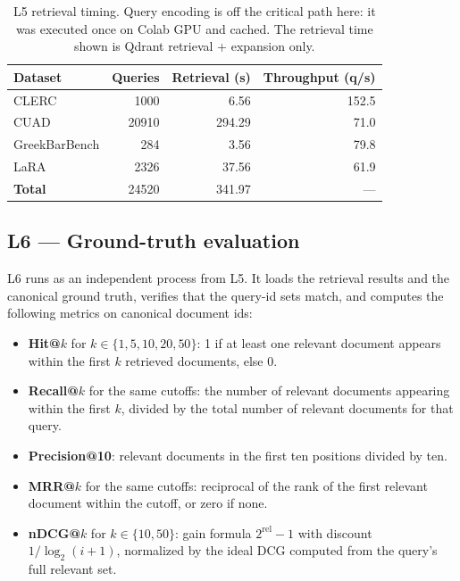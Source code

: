 \documentclass[11pt,a4paper]{article}
\begin{document}
\begin{table}[h]
\centering
\caption{L5 retrieval timing. Query encoding is off the critical
path here: it was executed once on Colab GPU and cached. The
retrieval time shown is Qdrant retrieval + expansion only.}
\label{tab:l5}
\small
\begin{tabular}{l r r r}
\toprule
\textbf{Dataset} & \textbf{Queries} & \textbf{Retrieval (s)}
  & \textbf{Throughput (q/s)} \\
\midrule
CLERC              & \num{1000}  & \num{6.56}   & \num{152.5} \\
CUAD               & \num{20910} & \num{294.29} & \num{71.0} \\
GreekBarBench      & \num{284}   & \num{3.56}   & \num{79.8} \\
LaRA               & \num{2326}  & \num{37.56}  & \num{61.9} \\
\midrule
\textbf{Total}     & \num{24520} & \num{341.97} & --- \\
\bottomrule
\end{tabular}
\end{table}

\subsection{L6 --- Ground-truth evaluation}
L6 runs as an independent process from L5. It loads the retrieval
results and the canonical ground truth, verifies that the query-id
sets match, and computes the following metrics on canonical
document ids:

\begin{itemize}[leftmargin=1.5em,itemsep=0.15em]
  \item \textbf{Hit@$k$} for $k \in \{1, 5, 10, 20, 50\}$:
    1 if at least one relevant document appears within the first
    $k$ retrieved documents, else 0.
  \item \textbf{Recall@$k$} for the same cutoffs: the number of
    relevant documents appearing within the first $k$, divided by
    the total number of relevant documents for that query.
  \item \textbf{Precision@10}: relevant documents in the first ten
    positions divided by ten.
  \item \textbf{MRR@$k$} for the same cutoffs: reciprocal of the
    rank of the first relevant document within the cutoff, or zero
    if none.
  \item \textbf{nDCG@$k$} for $k \in \{10, 50\}$: gain formula
    $2^{\mathrm{rel}} - 1$ with discount $1/\log_2(i+1)$, normalized
    by the ideal DCG computed from the query's full relevant set.
\end{itemize}
\end{document}
